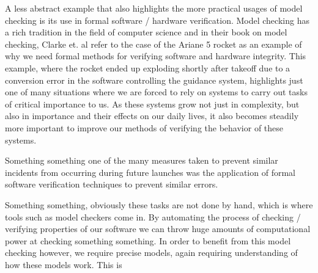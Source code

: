 
A less abstract example that also highlights the more practical usages of model checking is its use in formal software / hardware verification. Model checking has a rich tradition in the field of computer science and 
in their book on model checking, Clarke et. al \cite{Clarke1999} refer to the case of the Ariane 5 rocket as an example of why we need formal methods for verifying software and hardware integrity. This example, where the rocket ended up exploding shortly after takeoff due to a conversion error in the software controlling the guidance system, highlights just one of many situations where we are forced to rely on systems to carry out tasks of critical importance to us. As these systems grow not just in complexity, but also in importance and their effects on our daily lives, it also becomes steadily more important to improve our methods of verifying the behavior of these systems. 


Something something one of the many measures taken to prevent similar incidents from occurring during future launches was the application of formal software verification techniques to prevent similar errors.

Something something, obviously these tasks are not done by hand, which is where tools such as model checkers come in. By automating the process of checking / verifying properties of our software we can throw huge amounts of computational power at checking something something. In order to benefit from this model checking however, we require precise models, again requiring understanding of how these models work. This is 


